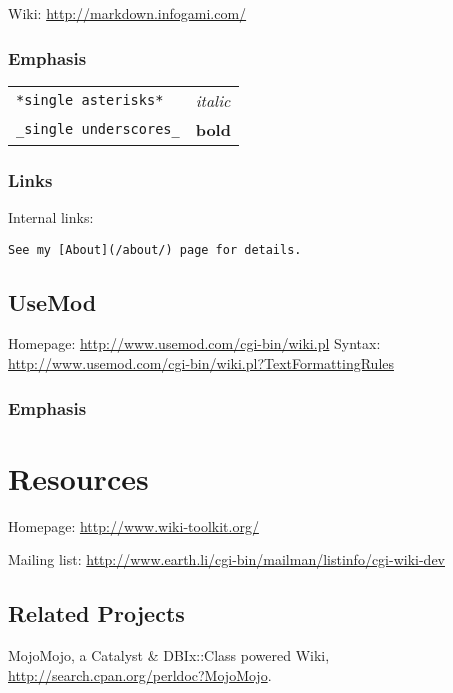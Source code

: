 Wiki: \url{http://markdown.infogami.com/}

\subsubsection{Emphasis}

\begin{tabular}{ll}
\verb|*single asterisks*| & \textit{italic} \\
\verb|_single underscores_| & \textbf{bold} \\
\end{tabular}


\subsubsection{Links}
Internal links:

\begin{verbatim}
See my [About](/about/) page for details.
\end{verbatim}

\subsection{UseMod}
Homepage: \url{http://www.usemod.com/cgi-bin/wiki.pl}
Syntax: \url{http://www.usemod.com/cgi-bin/wiki.pl?TextFormattingRules}

\subsubsection{Emphasis}

\section{Resources}

Homepage: \url{http://www.wiki-toolkit.org/}

Mailing list: \url{http://www.earth.li/cgi-bin/mailman/listinfo/cgi-wiki-dev}

\subsection{Related Projects}
MojoMojo, a Catalyst \& DBIx::Class powered Wiki,
\url{http://search.cpan.org/perldoc?MojoMojo}.


    

